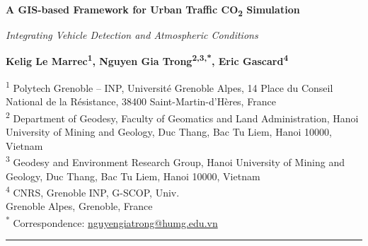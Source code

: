 \documentclass[12pt,a4paper]{article}
\begin{document}
\begin{center}
\vspace*{2pt}
{\fontsize{19}{22}\selectfont\bfseries
A GIS-based Framework for Urban Traffic CO\textsubscript{2} Simulation\par}

\vspace{6pt}
{\fontsize{12.5}{15}\selectfont\color{titlegray}\itshape
Integrating Vehicle Detection and Atmospheric Conditions\par}

\vspace{9pt}
{\fontsize{10.5}{12.5}\selectfont\bfseries
Kelig Le Marrec\textsuperscript{1},\quad
Nguyen Gia Trong\textsuperscript{2,3,*},\quad
Eric Gascard\textsuperscript{4}\par}

\vspace{6pt}
{\fontsize{8.5}{10.5}\selectfont
\textsuperscript{1} Polytech Grenoble -- INP, Université Grenoble Alpes,
14 Place du Conseil National de la Résistance, 38400 Saint-Martin-d'Hères, France\\[2pt]
\textsuperscript{2} Department of Geodesy, Faculty of Geomatics and Land Administration,
Hanoi University of Mining and Geology, Duc Thang, Bac Tu Liem, Hanoi 10000, Vietnam\\[2pt]
\textsuperscript{3} Geodesy and Environment Research Group,
Hanoi University of Mining and Geology, Duc Thang, Bac Tu Liem, Hanoi 10000, Vietnam\\[2pt]
\textsuperscript{4} CNRS, Grenoble INP, G-SCOP, Univ.\\ Grenoble Alpes, Grenoble, France\\[4pt]
\textsuperscript{*} Correspondence: \href{mailto:nguyengiatrong@humg.edu.vn}{nguyengiatrong@humg.edu.vn}
\par}

\vspace{6pt}
{\color{titlegray}\rule{0.82\textwidth}{0.5pt}}
\end{center}

\vspace{8pt}
\end{document}
